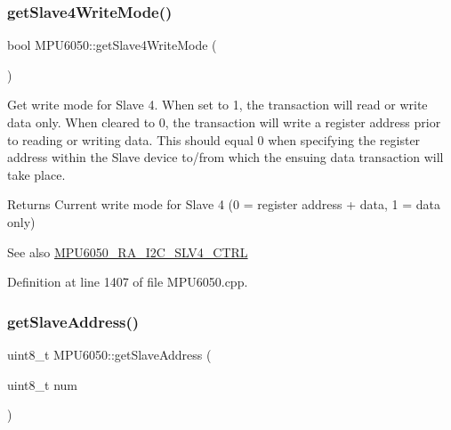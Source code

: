 \subsubsection{\texorpdfstring{getSlave4WriteMode()}{getSlave4WriteMode()}}
{\footnotesize\ttfamily bool M\+P\+U6050\+::get\+Slave4\+Write\+Mode (\begin{DoxyParamCaption}{ }\end{DoxyParamCaption})}

Get write mode for Slave 4. When set to 1, the transaction will read or write data only. When cleared to 0, the transaction will write a register address prior to reading or writing data. This should equal 0 when specifying the register address within the Slave device to/from which the ensuing data transaction will take place.

\begin{DoxyReturn}{Returns}
Current write mode for Slave 4 (0 = register address + data, 1 = data only) 
\end{DoxyReturn}
\begin{DoxySeeAlso}{See also}
\mbox{\hyperlink{MPU6050_8h_a2b6fbfceb145ba1c8b19f51475fd7a5d}{M\+P\+U6050\+\_\+\+R\+A\+\_\+\+I2\+C\+\_\+\+S\+L\+V4\+\_\+\+C\+T\+RL}} 
\end{DoxySeeAlso}


Definition at line 1407 of file M\+P\+U6050.\+cpp.


\begin{DoxyCode}{0}

\end{DoxyCode}
\mbox{\label{classMPU6050_af75b9f7ccac48515c7544238db0e6863}} 
\subsubsection{\texorpdfstring{getSlaveAddress()}{getSlaveAddress()}}
{\footnotesize\ttfamily uint8\+\_\+t M\+P\+U6050\+::get\+Slave\+Address (\begin{DoxyParamCaption}\item[{uint8\+\_\+t}]{num }\end{DoxyParamCaption})}

